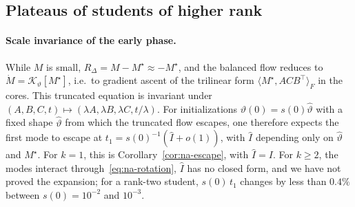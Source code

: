 \documentclass[11pt]{article}
\newcommand{\ip}[2]{\langle #1,#2\rangle}
\theoremstyle{definition}
\numberwithin{equation}{section}
\begin{document}
\subsection{Plateaus of students of higher rank}\label{sec:na-plateaus}

\paragraph{Scale invariance of the early phase.}
While $M$ is small, $R_\Delta=M-M^\star\approx-M^\star$, and the balanced flow reduces to $\dot M=\mathcal K_\vartheta[M^\star]$, i.e.\ to gradient ascent of the trilinear form $\ip{M^\star}{ACB^\top}_F$ in the cores. This truncated equation is invariant under $(A,B,C,t)\mapsto(\lambda A,\lambda B,\lambda C,t/\lambda)$. For initializations $\vartheta(0)=s(0)\hat\vartheta$ with a fixed shape $\hat\vartheta$ from which the truncated flow escapes, one therefore expects the first mode to escape at $t_1=s(0)^{-1}(\hat I+o(1))$, with $\hat I$ depending only on $\hat\vartheta$ and $M^\star$. For $k=1$, this is Corollary~\ref{cor:na-escape}, with $\hat I=I$. For $k\ge2$, the modes interact through~\eqref{eq:na-rotation}, $\hat I$ has no closed form, and we have not proved the expansion; for a rank-two student, $s(0)\,t_1$ changes by less than $0.4\%$ between $s(0)=10^{-2}$ and $10^{-3}$.
\end{document}
